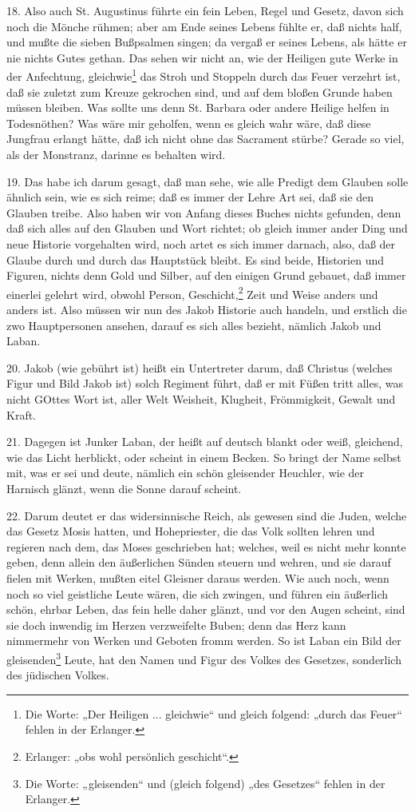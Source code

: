 18. Also auch St. Augustinus führte ein fein Leben, Regel und Gesetz, davon sich noch die Mönche rühmen; aber am Ende seines Lebens fühlte er, daß nichts half, und mußte die sieben Bußpsalmen singen; da vergaß er seines Lebens, als hätte er nie nichts Gutes gethan. Das sehen wir nicht an, wie der Heiligen gute Werke in der Anfechtung, gleichwie\footnote{Die Worte: „Der Heiligen ... gleichwie“ und gleich folgend: „durch das Feuer“ fehlen in der Erlanger.} das Stroh und Stoppeln durch das Feuer verzehrt ist, daß sie zuletzt zum Kreuze gekrochen sind, und auf dem bloßen Grunde haben müssen bleiben. Was sollte uns denn St. Barbara oder andere Heilige helfen in Todesnöthen? Was wäre mir geholfen, wenn es gleich wahr wäre, daß diese Jungfrau erlangt hätte, daß ich nicht ohne das Sacrament stürbe? Gerade so viel, als der Monstranz, darinne es behalten wird.

19. Das habe ich darum gesagt, daß man sehe, wie alle Predigt dem Glauben solle ähnlich sein, wie es sich reime; daß es immer der Lehre Art sei, daß sie den Glauben treibe. Also haben wir von Anfang dieses Buches nichts gefunden, denn daß sich alles auf den Glauben und Wort richtet; ob gleich immer ander Ding und neue Historie vorgehalten wird, noch artet es sich immer darnach, also, daß der Glaube durch und durch das Hauptstück bleibt. Es sind beide, Historien und Figuren, nichts denn Gold und Silber, auf den einigen Grund gebauet, daß immer einerlei gelehrt wird, obwohl Person, Geschicht,\footnote{Erlanger: „obs wohl persönlich geschicht“.} Zeit und Weise anders und anders ist. Also müssen wir nun des Jakob Historie auch handeln, und erstlich die zwo Hauptpersonen ansehen, darauf es sich alles bezieht, nämlich Jakob und Laban.

20. Jakob (wie gebührt ist) heißt ein Untertreter darum, daß Christus (welches Figur und Bild Jakob ist) solch Regiment führt, daß er mit Füßen tritt alles, was nicht GOttes Wort ist, aller Welt Weisheit, Klugheit, Frömmigkeit, Gewalt und Kraft.

21. Dagegen ist Junker Laban, der heißt auf deutsch blankt oder weiß, gleichend, wie das Licht herblickt, oder scheint in einem Becken. So bringt der Name selbst mit, was er sei und deute, nämlich ein schön gleisender Heuchler, wie der Harnisch glänzt, wenn die Sonne darauf scheint.

22. Darum deutet er das widersinnische Reich, als gewesen sind die Juden, welche das Gesetz Mosis hatten, und Hohepriester, die das Volk sollten lehren und regieren nach dem, das Moses geschrieben hat; welches, weil es nicht mehr konnte geben, denn allein den äußerlichen Sünden steuern und wehren, und sie darauf fielen mit Werken, mußten eitel Gleisner daraus werden. Wie auch noch, wenn noch so viel geistliche Leute wären, die sich zwingen, und führen ein äußerlich schön, ehrbar Leben, das fein helle daher glänzt, und vor den Augen scheint, sind sie doch inwendig im Herzen verzweifelte Buben; denn das Herz kann nimmermehr von Werken und Geboten fromm werden. So ist Laban ein Bild der gleisenden\footnote{Die Worte: „gleisenden“ und (gleich folgend) „des Gesetzes“ fehlen in der Erlanger.} Leute, hat den Namen und Figur des Volkes des Gesetzes, sonderlich des jüdischen Volkes.

